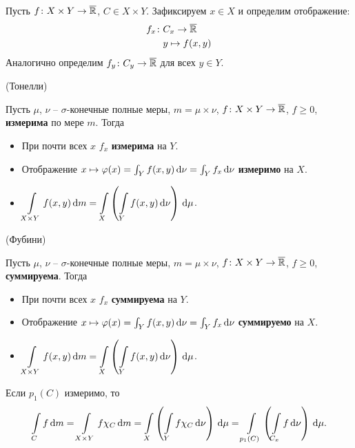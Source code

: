 \begin{definition}
    Пусть $f \colon X \times Y \to \overline{\mathbb{R}}$, $C \in X \times Y$. Зафиксируем $x \in X$
    и определим отображение:
\begin{align*}
    f_x \colon &C_x \to \overline{\mathbb{R}} \\
               &y \mapsto f(x, y)
\end{align*}
    Аналогично определим $f_y \colon C_y \to \overline{\mathbb{R}}$ для всех $y \in Y$.
\end{definition}

\begin{theorem}(Тонелли)
    
    Пусть $\mu$, $\nu$ -- $\sigma$-конечные полные меры, $m = \mu \times \nu$,
    $f \colon X \times Y \to \overline{\mathbb{R}}$, $f \geqslant 0$, \textbf{измерима} по мере $m$.
    Тогда
    \begin{itemize}
        \item При почти всех $x$ $f_x$ \textbf{измерима} на $Y$.
        \item Отображение $x \mapsto \varphi(x) = \int_{Y}{f(x, y) \,\mathrm{d}\nu} 
        = \int_{Y}{f_x \,\mathrm{d}\nu}$ \textbf{измеримо} на $X$.
        \item $\displaystyle \int\limits_{X \times Y}{f(x, y) \,\mathrm{d} m} 
            = \int\limits_{X}{\left(\int\limits_{Y}{f(x, y) \,\mathrm{d}\nu}\right) \,\mathrm{d}\mu}$.
    \end{itemize} 
\end{theorem}

\begin{theorem}(Фубини)
    
    Пусть $\mu$, $\nu$ -- $\sigma$-конечные полные меры, $m = \mu \times \nu$,
    $f \colon X \times Y \to \overline{\mathbb{R}}$, $f \geqslant 0$, \textbf{суммируема}.
    Тогда
    \begin{itemize}
        \item При почти всех $x$ $f_x$ \textbf{суммируема} на $Y$.
        \item Отображение $x \mapsto \varphi(x) = \int_{Y}{f(x, y) \,\mathrm{d}\nu} 
            = \int_{Y}{f_x \,\mathrm{d}\nu}$ \textbf{суммируемо} на $X$.
        \item $\displaystyle \int\limits_{X \times Y}{f(x, y) \,\mathrm{d} m} 
            = \int\limits_{X}{\left(\int\limits_{Y}{f(x, y) \,\mathrm{d}\nu}\right) \,\mathrm{d}\mu}$.
    \end{itemize} 
\end{theorem}

\begin{corollary}
    Если $p_1(C)$ измеримо, то
\[
    \int\limits_{C}{f \,\mathrm{d} m} = \int\limits_{X \times Y}{f \chi_C \,\mathrm{d} m} 
    = \int\limits_{X}{\left(\int\limits_{Y}{f \chi_C \,\mathrm{d}\nu}\right) \,\mathrm{d}\mu}
    = \int\limits_{p_1(C)}{\left(\int\limits_{C_x}{f \,\mathrm{d}\nu}\right) \,\mathrm{d}\mu}
.\]
\end{corollary}

